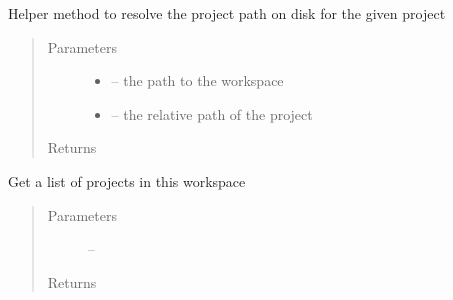 \documentclass[letterpaper,10pt,english]{sphinxmanual}
\begin{document}
\begin{fulllineitems}
\label{_source/son_editor.impl:son_editor.impl.projectsimpl.get_project}
\end{fulllineitems}


\begin{fulllineitems}
\label{_source/son_editor.impl:son_editor.impl.projectsimpl.get_project_path}
Helper method to resolve the project path on disk for the given project
\begin{quote}\begin{description}
\item[{Parameters}] \leavevmode\begin{itemize}
\item {} 
 -- the path to the workspace

\item {} 
 -- the relative path of the project

\end{itemize}

\item[{Returns}] \leavevmode


\end{description}\end{quote}

\end{fulllineitems}


\begin{fulllineitems}
\label{_source/son_editor.impl:son_editor.impl.projectsimpl.get_projects}
Get a list of projects in this workspace
\begin{quote}\begin{description}
\item[{Parameters}] \leavevmode
{} -- 

\item[{Returns}] \leavevmode


\end{description}\end{quote}

\end{fulllineitems}
\end{document}
